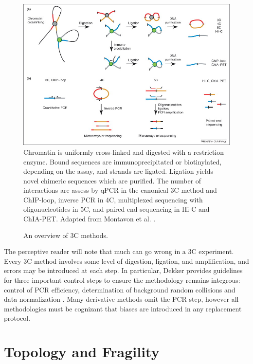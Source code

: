 \begin{figure}[H]
  \centering
  \caption{An overview of \gls{3C} methods.}\label{fig:captureTechniques}
  \includegraphics[width=\textwidth]{figures/biology/CompareChromosomeCapture}
  \medskip
  \small
  Chromatin is uniformly cross-linked and digested with a restriction enzyme.
  Bound sequences are immunoprecipitated or biotinylated, depending on the
  assay, and strands are ligated.  Ligation yields novel chimeric sequences
  which are purified.  The number of interactions are assess by qPCR in
  the canonical \gls{3C} method and ChIP-loop, inverse PCR in 4C, multiplexed
  sequencing with oligonucleotides in 5C, and paired end sequencing in Hi-C
  and ChIA-PET\@.  Adapted from Montavon et al. \citep{montavon2012}.
\end{figure}


The perceptive reader will note that much can go wrong in a \gls{3C} experiment. Every \gls{3C} method involves some level of digestion, ligation,
and amplification, and errors may be introduced at each step.  In particular, Dekker provides guidelines for three important control steps to
ensure the methodology remains integrous: control of PCR efficiency, determination of background random collisions and data
normalization \citep{dekker2006}.  Many derivative methods omit the PCR step, however all methodologies must be cognizant that
biases are introduced in any replacement protocol.

\section*{Topology and Fragility}

